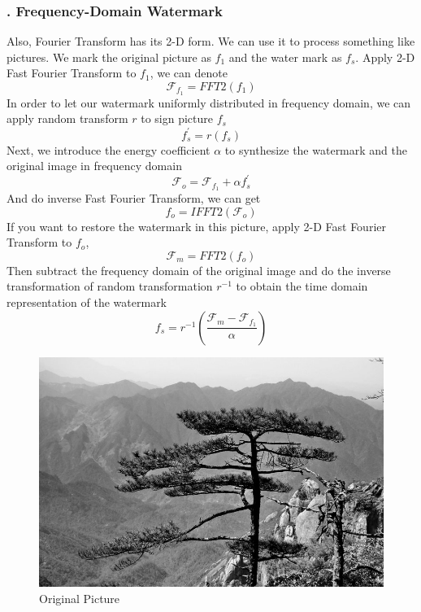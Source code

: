 \documentclass[margin,line]{res}
\begin{document}
\begin{resume}
\subsubsection{. Frequency-Domain Watermark}
Also, Fourier Transform has its 2-D form. We can use it to process something like pictures. We mark the original picture as $f_1$ and the water mark as $f_s$. Apply 2-D Fast Fourier Transform to $f_1$, we can denote
$$
\mathscr{F}_{f_1} = FFT2(f_1)
$$
In order to let our watermark uniformly distributed in frequency domain, we can apply random transform $r$ to sign picture $f_s$
$$
f_s^{'} = r(f_s)
$$
Next, we introduce the energy coefficient $\alpha$ to synthesize the watermark and the original image in frequency domain
$$
\mathscr{F}_{o} = \mathscr{F}_{f_1} + \alpha f_s^{'}
$$
And do inverse Fast Fourier Transform, we can get
$$
f_o = IFFT2(\mathscr{F}_{o})
$$
If you want to restore the watermark in this picture, apply 2-D Fast Fourier Transform to $f_o$, 
$$
\mathscr{F}_m = FFT2(f_o)
$$
Then subtract the frequency domain of the original image and do the inverse transformation of random transformation $r^{-1}$ to obtain the time domain representation of the watermark
$$
f_s = r^{-1} (\frac{\mathscr{F}_m - \mathscr{F}_{f_1}}{\alpha})
$$
\begin{figure}[H]
	\begin{minipage}{0.5\linewidth}
		\includegraphics[width=\linewidth]{figure/watermark/origin.png}
		\caption*{Original Picture}
	\end{minipage}
	\begin{minipage}{0.5\linewidth}

\end{minipage}
\end{figure}
\end{resume}
\end{document}
